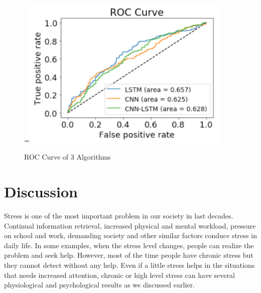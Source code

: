 \documentclass[12pt,oneandhalf,chaparabic,lfm,phd,eng,oneside,pntc]{gsufbe}
\makeatletter
\let\old@includegraphics\includegraphics
\renewcommand{\includegraphics}[2][,]{%
  \setbox9=\hbox{\old@includegraphics[#1]{#2}}%
  \ifdim\wd9>\textwidth
    \old@includegraphics[#1,width=\textwidth]{#2}%
  \else
    \old@includegraphics[#1]{#2}%
  \fi%
}
\makeatother
\begin{document}
\begin{figure}[t]\vspace*{4pt}
\centerline{\includegraphics[width=100mm]{graphics/ROC.jpg}}
\caption{ROC Curve of 3 Algorithms}
\label{fig:ROC Curve}
\end{figure}


\chapter{Discussion}
\label{chap:Discussion}
Stress is one of the most important problem in our society in last decades.
Continual information retrieval, increased physical and mental workload, pressure on school and work, demanding society and other similar factors conduce stress in daily life. In some examples, when the stress level changes, people can realize the problem and seek help. However, most of the time people have chronic stress but they cannot detect without any help. Even if a little stress helps in the situations that needs increased attention, chronic or high level stress can have several physiological and psychological results as we discussed earlier.   
\end{document}
